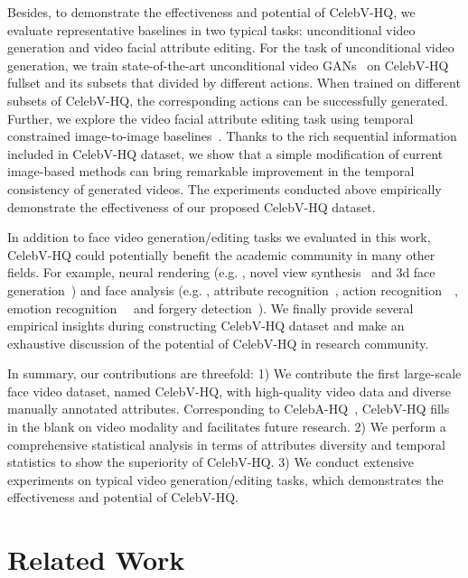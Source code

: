 Besides, to demonstrate the effectiveness and potential of CelebV-HQ, we evaluate representative baselines in two typical tasks: unconditional video generation and video facial attribute editing. For the task of unconditional video generation, we train state-of-the-art unconditional video GANs~\cite{mocoganhd,digan} on CelebV-HQ fullset and its subsets that divided by different actions. When trained on different subsets of CelebV-HQ, the corresponding actions can be successfully generated. Further, we explore the video facial attribute editing task using temporal constrained image-to-image baselines~\cite{munit,starganv2}. Thanks to the rich sequential information included in CelebV-HQ dataset, we show that a simple modification of current image-based methods can bring remarkable improvement in the temporal consistency of generated videos. The experiments conducted above empirically demonstrate the effectiveness of our proposed CelebV-HQ dataset.

In addition to face video generation/editing tasks we evaluated in this work, CelebV-HQ could potentially benefit the academic community in many other fields. For example, neural rendering (e.g. , novel view synthesis~\cite{headnerf,stylenerf,or2021stylesdf} and 3d face generation~\cite{chan2021pigan,or2021stylesdf,eg3d,guo2021adnerf,Gafni_2021_CVPR,chen2022sem2nerf}) and face analysis (e.g. , attribute recognition~\cite{zhong2016face,ding2018deep,fairface}, action recognition~~\cite{wang2013action,jegham2020vision}, emotion recognition~~\cite{dzedzickis2020human,lee2019context} and forgery detection~\cite{li2020face,haliassos2021lips,zhu2021face}). We finally provide several empirical insights during constructing CelebV-HQ dataset and make an exhaustive discussion of the potential of CelebV-HQ in research community.

In summary, our contributions are threefold: 1) We contribute the first large-scale face video dataset, named CelebV-HQ, with high-quality video data and diverse manually annotated attributes. Corresponding to CelebA-HQ~\cite{celebahq}, CelebV-HQ fills in the blank on video modality and facilitates future research. 2) We perform a comprehensive statistical analysis in terms of attributes diversity and temporal statistics to show the superiority of CelebV-HQ. 3) We conduct extensive experiments on typical video generation/editing tasks, which demonstrates the effectiveness and potential of CelebV-HQ.

\section{Related Work}

